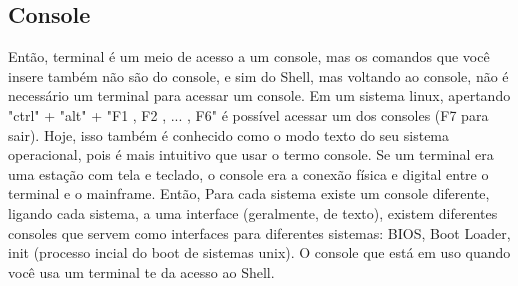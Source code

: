 	\subsection{Console}
	Então, terminal é um meio de acesso a um console, mas os comandos que você insere também não são do console, e sim do Shell, mas voltando ao console, não é necessário um terminal para acessar um console. Em um sistema linux, apertando "ctrl" + "alt" + "F1 , F2 , ... , F6" é possível acessar um dos consoles (F7 para sair). Hoje, isso também é conhecido como o modo texto do seu sistema operacional, pois é mais intuitivo que usar o termo console. Se um terminal era uma estação com tela e teclado, o console era a conexão física e digital entre o terminal e o mainframe. Então, Para cada sistema existe um console diferente, ligando cada sistema, a uma interface (geralmente, de texto), existem diferentes consoles que servem como interfaces para diferentes sistemas: BIOS, Boot Loader, init (processo incial do boot de sistemas unix). O console que está em uso quando você usa um terminal te da acesso ao Shell.
